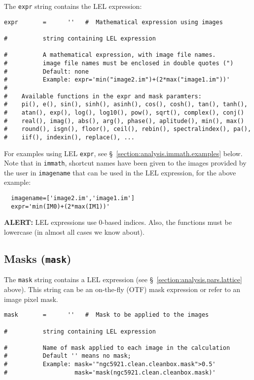 The {\tt expr} string contains the LEL expression:
\small
\begin{verbatim}
expr       =      ''   #  Mathematical expression using images

#          string containing LEL expression

#          A mathematical expression, with image file names.
#          image file names must be enclosed in double quotes (")
#          Default: none 
#          Example: expr='min("image2.im")+(2*max("image1.im"))'
#
#    Available functions in the expr and mask paramters:
#    pi(), e(), sin(), sinh(), asinh(), cos(), cosh(), tan(), tanh(),
#    atan(), exp(), log(), log10(), pow(), sqrt(), complex(), conj()
#    real(), imag(), abs(), arg(), phase(), aplitude(), min(), max()
#    round(), isgn(), floor(), ceil(), rebin(), spectralindex(), pa(), 
#    iif(), indexin(), replace(), ...
\end{verbatim}
\normalsize

For examples using LEL {\tt expr}, see 
\S~\ref{section:analysis.immath.examples} below.  Note that in
{\tt immath}, shortcut names have been given to the images provided
by the user in {\tt imagename} that can be used in the LEL expression,
for the above example:
\small
\begin{verbatim}
  imagename=['image2.im','image1.im']
  expr='min(IM0)+(2*max(IM1))'
\end{verbatim}
\normalsize


{\bf ALERT:} LEL expressions use 0-based indices.
Also, the functions must be lowercase (in almost all cases we know
about).
    
\subsection{Masks ({\tt mask})}
\label{section:analysis.pars.mask}

The {\tt mask} string contains a LEL expression 
(see \S~\ref{section:analysis.pars.lattice} above).  This string
can be an on-the-fly (OTF) mask expression or refer to an 
image pixel mask.
\small
\begin{verbatim}
mask       =      ''   #  Mask to be applied to the images

#          string containing LEL expression

#          Name of mask applied to each image in the calculation
#          Default '' means no mask;  
#          Example: mask='"ngc5921.clean.cleanbox.mask">0.5'
#                   mask='mask(ngc5921.clean.cleanbox.mask)'
\end{verbatim}
\normalsize

